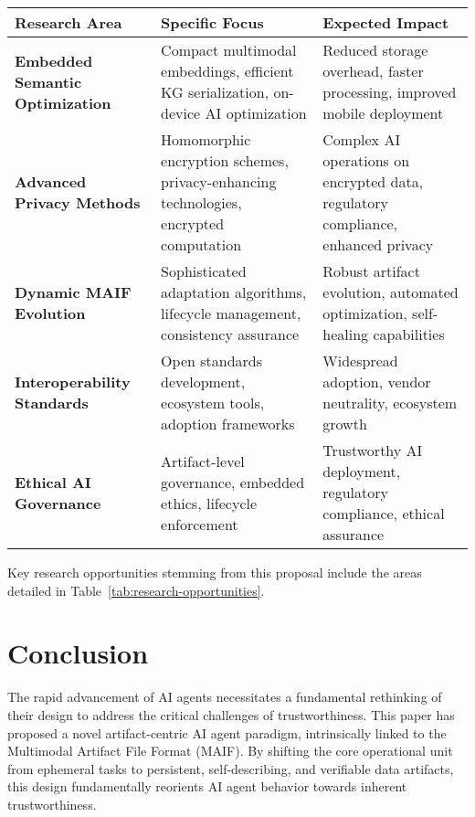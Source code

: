 \documentclass[conference]{IEEEtran}
\begin{document}
\begin{table*}[!t]
\renewcommand{\arraystretch}{1.3}
\caption{Key Research Opportunities and Development Priorities}
\label{tab:research-opportunities}
\centering
\footnotesize
\begin{tabular}{p{4cm}p{5.5cm}p{4.5cm}}
\toprule
\textbf{Research Area} & \textbf{Specific Focus} & \textbf{Expected Impact} \\
\midrule
\textbf{Embedded Semantic Optimization} & Compact multimodal embeddings, efficient KG serialization, on-device AI optimization & Reduced storage overhead, faster processing, improved mobile deployment \\
\midrule
\textbf{Advanced Privacy Methods} & Homomorphic encryption schemes, privacy-enhancing technologies, encrypted computation & Complex AI operations on encrypted data, regulatory compliance, enhanced privacy \\
\midrule
\textbf{Dynamic MAIF Evolution} & Sophisticated adaptation algorithms, lifecycle management, consistency assurance & Robust artifact evolution, automated optimization, self-healing capabilities \\
\midrule
\textbf{Interoperability Standards} & Open standards development, ecosystem tools, adoption frameworks & Widespread adoption, vendor neutrality, ecosystem growth \\
\midrule
\textbf{Ethical AI Governance} & Artifact-level governance, embedded ethics, lifecycle enforcement & Trustworthy AI deployment, regulatory compliance, ethical assurance \\
\bottomrule
\end{tabular}
\end{table*}

Key research opportunities stemming from this proposal include the areas detailed in Table~\ref{tab:research-opportunities}.

\section{Conclusion}
\label{sec:conclusion}

The rapid advancement of AI agents necessitates a fundamental rethinking of their design to address the critical challenges of trustworthiness. This paper has proposed a novel artifact-centric AI agent paradigm, intrinsically linked to the Multimodal Artifact File Format (MAIF). By shifting the core operational unit from ephemeral tasks to persistent, self-describing, and verifiable data artifacts, this design fundamentally reorients AI agent behavior towards inherent trustworthiness.
\end{document}
